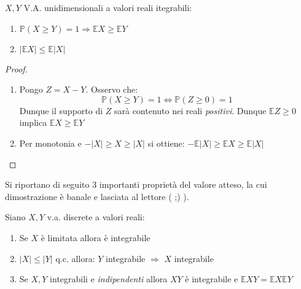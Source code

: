 \begin{theorem}
$X,Y$ V.A. unidimensionali a valori reali itegrabili: 
\begin{enumerate}
    \item $\mathbb{P}(X\geq Y)=1 \Rightarrow \mathbb{E}X\geq\mathbb{E}Y$
    \item $|\mathbb{E}X|\leq\mathbb{E}|X|$
\end{enumerate}
\begin{proof}
\begin{enumerate}
    \item Pongo $Z=X-Y$. Osservo che: \[\mathbb{P}(X\geq Y) = 1 \Leftrightarrow \mathbb{P}(Z\geq 0) = 1\]
    Dunque il supporto di $Z$ sarà contenuto nei reali \textit{positivi}. Dunque $\mathbb{E}Z\geq 0$ implica $\mathbb{E}X\geq\mathbb{E}Y$
    \item Per monotonia e $-|X|\geq X\geq|X|$ si ottiene: $-\mathbb{E}|X|\geq \mathbb{E}X\geq\mathbb{E}|X|$
\end{enumerate}

\vspace{5px}
\noindent
\end{proof}
\end{theorem}

Si riportano di seguito 3 importanti proprietà del valore atteso, la cui dimostrazione è banale e lasciata al lettore ( ;) ).

\begin{proposition}
Siano $X,Y$ v.a. discrete a valori reali:
\begin{enumerate}
    \item Se $X$ è limitata allora è integrabile
    \item $|X|\leq|Y|$ q.c. allora: $Y$ integrabile $\Rightarrow$ $X$ integrabile
    \item Se $X,Y$ integrabili e \textit{indipendenti} allora $XY$ è integrabile e $\mathbb{E}XY=\mathbb{E}X\mathbb{E}Y$ 
\end{enumerate}
\end{proposition}